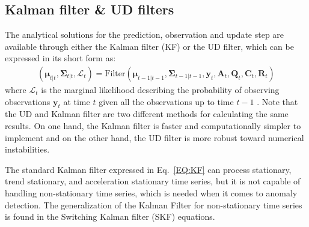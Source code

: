 \subsection{Kalman filter \& UD filters}
\label{SS:KFUD}
The analytical solutions for the prediction, observation and update step are available through either the Kalman filter (KF) or the UD filter, which can be expressed in its short form as:
\begin{equation}
    \begin{split}
      (\bm{\mu}_{t|t},\bm{\Sigma}_{t|t}, \mathcal{L}_{t}) = \text{Filter}(\bm{\mu}_{t-1|t-1},\bm{\Sigma}_{t-1|t-1},\mathbf{y}_{t}, \mathbf{A}_{t},  \mathbf{Q}_{t},   \mathbf{C}_{t},  \mathbf{R}_{t})
      \end{split}
\label{EQ:KF}
\end{equation}
where $\mathcal{L}_{t}$ is the marginal likelihood describing the probability of observing observations $\mathbf{y}_{t}$ at time $t$ given all the observations up to time $t-1$ \cite{sarkka2013bayesian}. 
Note that the UD and Kalman filter are two different methods for calculating the same results. On one hand, the Kalman filter is faster and computationally simpler to implement and on the other hand, the UD filter is more robust toward numerical instabilities.   


The standard Kalman filter expressed in Eq.~\ref{EQ:KF} can process stationary, trend stationary, and acceleration stationary time series, but it is not capable of handling non-stationary time series, which is needed when it comes to anomaly detection.
The generalization of the Kalman Filter for non-stationary time series is found in the Switching Kalman filter (SKF) equations.

